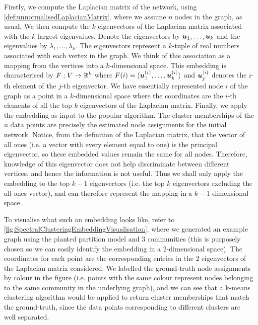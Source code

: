 Firstly, we compute the Laplacian matrix of the network, using \cref{def:unnormalisedLaplacianMatrix}, where we assume $n$ nodes in the graph, as usual.
We then compute the $k$ eigenvectors of the Laplacian matrix associated with the $k$ largest eigenvalues.
Denote the eigenvectors by $\vecvar{u}_{1},\dots,\vecvar{u}_{k}$ and the eigenvalues by $\lambda_{1},\dots,\lambda_{k}$.
The eigenvectors represent a $k$-tuple of real numbers associated with each vertex in the graph. 
We think of this association as a mapping from the vertices into a $k$-dimensional space.
This embedding is characterised by $F : V \rightarrow \mathbb{R}^{k}$ where $F(i) = (\vecvar{u}_{1}^{(i)},\dots,\vecvar{u}_{k}^{(i)})$ and $\vecvar{u}_{j}^{(i)}$ denotes the $i$-th element of the $j$-th eigenvector.
We have essentially represented node $i$ of the graph as a point in a $k$-dimensional space where the coordinates are the $i$-th elements of all the top $k$ eigenvectors of the Laplacian matrix.
Finally, we apply the embedding as input to the popular  algorithm.
The cluster memberships of the $n$ data points are precisely the estimated node assignments for the initial network.
Notice, from the definition of the Laplacian matrix, that the vector of all ones (i.e. a vector with every element equal to one) is the principal eigenvector, so these embedded values remain the same for all nodes.
Therefore, knowledge of this eigenvector does not help discriminate between different vertices, and hence the information is not useful.
Thus we shall only apply the embedding to the top $k-1$ eigenvectors (i.e. the top $k$ eigenvectors excluding the all-ones vector), and can therefore represent the mapping in a $k-1$ dimensional space.

To visualise what such an embedding looks like, refer to \cref{fig:SpectralClusteringEmbeddingVisualisation}, where we generated an example graph using the planted partition model and 3 communities (this is purposely chosen so we can easily identify the embedding in a 2-dimensional space).
The coordinates for each point are the corresponding entries in the 2 eigenvectors of the Laplacian matrix considered.
We labelled the ground-truth node assignments by colour in the figure (i.e. points with the same colour represent nodes belonging to the same community in the underlying graph), and we can see that a k-means clustering algorithm would be applied to return cluster memberships that match the ground-truth, since the data points corresponding to different clusters are well separated.

